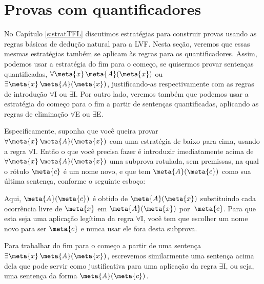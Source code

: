   

\chapter{Provas com quantificadores}

No Capítulo \ref{s:stratTFL}  discutimos estratégias para construir provas usando as regras básicas de dedução natural para a LVF.  Nesta seção, veremos que essas mesmas estratégias também se aplicam às regras para os quantificadores. Assim, podemos usar a estratégia do fim para o começo, se quisermos provar sentenças quantificadas,  $\forall \meta{x}\, \atom{\meta{A}}{\meta{x}}$ ou $\exists \meta{x}\, \atom{\meta{A}}{\meta{x}}$, justificando-as respectivamente com as regras de introdução $\forall$I ou $\exists$I. Por outro lado, veremos também que podemos usar a estratégia do começo para o fim a partir de sentenças quantificadas, aplicando as regras de eliminação $\forall$E ou $\exists$E.

Especificamente, suponha que você queira provar $\forall \meta{x}\, \atom{\meta{A}}{\meta{x}}$ com uma estratégia de baixo para cima, usando a regra $\forall$I. Então o que você precisa fazer é introduzir imediatamente acima de $\forall \meta{x}\, \atom{\meta{A}}{\meta{x}}$ uma subprova rotulada, sem premissas, na qual o rótulo $\meta{c}$ é um nome novo, e que tem $\atom{\meta{A}}{\meta{c}}$ como sua última sentença, conforme o seguinte esboço:
 
\begin{fitchproof}
\open
	\ellipsesline
\close
\end{fitchproof}

 Aqui, $\atom{\meta{A}}{\meta{c}}$ é obtido de $\atom{\meta{A}}{\meta{x}}$ substituindo cada ocorrência livre de $\meta{x}$ em $\atom{\meta{A}}{\meta{x}}$ por~$\meta{c}$.  Para que esta seja uma aplicação legítima da regra  $\forall$I, você tem que escolher um nome novo para ser $\meta{c}$ e nunca usar ele fora desta subprova.


Para trabalhar do fim para o começo  a partir de uma sentença $\exists \meta{x}\, \atom{\meta{A}}{\meta{x}}$, escrevemos similarmente uma sentença acima dela que pode servir como justificativa para uma aplicação da regra $\exists$I, ou seja, uma sentença da forma $\atom{\meta{A}}{\meta{c}}$. 
\begin{fitchproof}
	\ellipsesline
\end{fitchproof}

